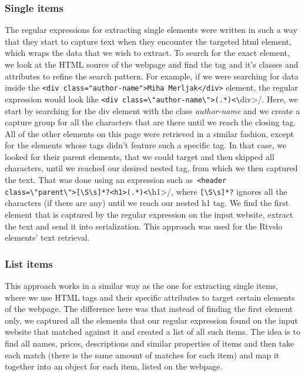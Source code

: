 \documentclass[9pt]{IEEEtran}
\begin{document}
\subsubsection{Single items}
The regular expressions for extracting single elements were written in such a way that they start to capture text when they encounter the targeted html element, which wraps the data that we wish to extract. To search for the exact element, we look at the HTML source of the webpage and find the tag and it's classes and attributes to refine the search pattern. For example, if we were searching for data inside the \texttt{<div class="author-name">Miha Merljak</div>} element, the regular expression would look like \verb/<div class=\"author-name\">(.*)<\/div>/. Here, we start by searching for the div element with the class \textit{author-name} and we create a capture group for all the characters that are there until we reach the closing tag. All of the other elements on this page were retrieved in a similar fashion, except for the elements whose tags didn't feature such a specific tag. In that case, we looked for their parent elements, that we could target and then skipped all characters, until we reached our desired nested tag, from which we then captured the text. That was done using an expression such as~\verb/<header class=\"parent\">[\S\s]*?<h1>(.*)<\/h1>/, where \verb/[\S\s]*?/ ignores all the characters (if there are any) until we reach our nested h1 tag. We find the first element that is captured by the regular expression on the input website, extract the text and send it into serialization. This approach was used for the Rtvslo elements' text retrieval.

\subsubsection{List items}

This approach works in a similar way as the one for extracting single items, where we use HTML tags and their specific attributes to target certain elements of the webpage. The difference here was that instead of finding the first element only, we captured all the elements that our regular expression found on the input website that matched against it and created a list of all such items.
The idea is to find all names, prices, descriptions and similar properties of items and then take each match (there is the same amount of matches for each item) and map it together into an object for each item, listed on the webpage.
\end{document}
